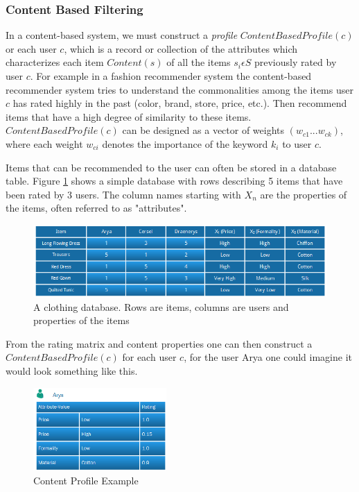 \subsubsection{Content Based Filtering}

In a content-based system, we must construct a \emph{profile} $ContentBasedProfile(c)$ or each user $c$, which is a record or collection of the attributes which characterizes each item $Content(s)$ of all the items $s_{i} \epsilon S$ previously rated by user $c$. For example in a fashion recommender system the content-based recommender system tries to understand the commonalities among the items user $c$ has rated highly in the past (color, brand, store, price, etc.). Then recommend items that have a high degree of similarity to these items. $ContentBasedProfile(c)$ can be designed as a vector of weights $(w_{c1} ... w_{ck})$, where each weight $w_{ci}$ denotes the importance of the keyword $k_{i}$ to user $c$.

Items that can be recommended to the user can often be stored in a database table. Figure \ref{figure:contentbaseddb} shows a simple database with rows describing 5 items that have been rated by 3 users. The column names starting with $X_{n}$ are the properties of the items, often referred to as "attributes".

\begin{figure}[H]
    \includegraphics[width=5in]{image/contentbaseddb.png}
    \centering
    \caption[A clothing database]{A clothing database. Rows are items, columns are users and properties of the items}
    \label{figure:contentbaseddb}
\end{figure}

From the rating matrix and content properties one can then construct a $ContentBasedProfile(c)$ for each user $c$, for the user Arya one could imagine it would look something like this.

\begin{figure}[H]
    \includegraphics[width=2in]{image/contentprofile.png}
    \centering
    \caption[Content Profile Example]{Content Profile Example}
    \label{figure:contentprofile}
\end{figure}


